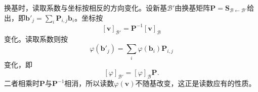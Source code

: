 换基时，读取系数与坐标按相反的方向变化。设新基$\mathcal B'$由换基矩阵$\bm P=\bm S_{\mathcal B\leftarrow\mathcal B'}$给出，即$\bm b'_j=\sum_i\bm P_{i,j}\bm b_i$。坐标按
\[
 [\bm v]_{\mathcal B'}=\bm P^{-1}[\bm v]_{\mathcal B}
\]
变化。读取系数则按
\[
 \varphi(\bm b'_j)=\sum_i\varphi(\bm b_i)\bm P_{i,j}
\]
变化，即
\[
 [\varphi]_{\mathcal B'}=[\varphi]_{\mathcal B}\bm P.
\]
二者相乘时$\bm P$与$\bm P^{-1}$相消，所以读数$\varphi(\bm v)$不随基改变，这正是读数应有的性质。
